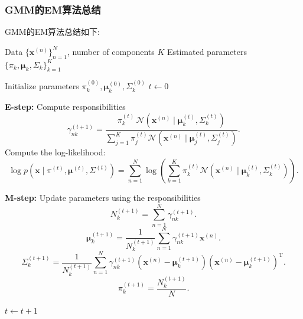 \documentclass[withoutpreface,bwprint]{NoteBook}
\begin{document}
\subsubsection{GMM的EM算法总结}
GMM的EM算法总结如下:
\begin{algorithm}[H]
    \caption{EM Algorithm for Gaussian Mixture Models (GMM)}
    \begin{algorithmic}[1]
        \REQUIRE Data $\{\mathbf{x}^{(n)}\}_{n=1}^N$, number of components $K$
        \ENSURE Estimated parameters $\{\pi_k, \boldsymbol{\mu}_k, \Sigma_k\}_{k=1}^K$

        \STATE Initialize parameters $\pi_k^{(0)}, \boldsymbol{\mu}_k^{(0)}, \Sigma_k^{(0)}$
        \STATE $t \leftarrow 0$

        \REPEAT
            \STATE \textbf{E-step:} Compute responsibilities
            \[
                \gamma_{nk}^{(t+1)}
                =
                \frac{\pi_k^{(t)} \, 
                \mathcal{N}(\mathbf{x}^{(n)} \mid \boldsymbol{\mu}_k^{(t)}, \Sigma_k^{(t)})}
                {\sum_{j=1}^K 
                \pi_j^{(t)}
                \mathcal{N}(\mathbf{x}^{(n)} \mid \boldsymbol{\mu}_j^{(t)}, \Sigma_j^{(t)})}.
            \]
            Compute the log-likelihood:
            \[
                \log p(\mathbf{x} \mid \pi^{(t)}, \boldsymbol{\mu}^{(t)}, \Sigma^{(t)})
                = \sum_{n=1}^N 
                \log \left( \sum_{k=1}^K 
                \pi_k^{(t)} 
                \mathcal{N}(\mathbf{x}^{(n)} \mid \boldsymbol{\mu}_k^{(t)}, \Sigma_k^{(t)}) \right).
            \]

            \STATE \textbf{M-step:} Update parameters using the responsibilities
            \[
                N_k^{(t+1)} = \sum_{n=1}^N \gamma_{nk}^{(t+1)}.
            \]
            \[
                \boldsymbol{\mu}_k^{(t+1)}
                = \frac{1}{N_k^{(t+1)}} 
                \sum_{n=1}^N \gamma_{nk}^{(t+1)} \mathbf{x}^{(n)}.
            \]
            \[
                \Sigma_k^{(t+1)}
                = \frac{1}{N_k^{(t+1)}}
                \sum_{n=1}^N \gamma_{nk}^{(t+1)}
                \left(\mathbf{x}^{(n)} - \boldsymbol{\mu}_k^{(t+1)}\right)
                \left(\mathbf{x}^{(n)} - \boldsymbol{\mu}_k^{(t+1)}\right)^{\mathrm{T}}.
            \]
            \[
                \pi_k^{(t+1)} = \frac{N_k^{(t+1)}}{N}.
            \]

            \STATE $t \leftarrow t + 1$


    \end{algorithmic}
\end{algorithm}
\end{document}

